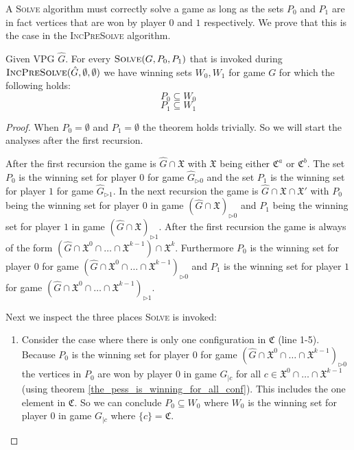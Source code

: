 A \textsc{Solve} algorithm must correctly solve a game as long as the sets $P_0$ and $P_1$ are in fact vertices that are won by player $0$ and $1$ respectively. We prove that this is the case in the \textsc{IncPreSolve} algorithm.
\begin{theorem}
	Given VPG $\hat{G}$. For every $\textsc{Solve}(G,P_0,P_1)$ that is invoked during $\textsc{IncPreSolve}(\hat{G},\emptyset,\emptyset)$ we have winning sets $W_0,W_1$ for game $G$ for which the following holds:
	\[ P_0 \subseteq  W_0 \]
	\[ P_1 \subseteq  W_1 \]
	\begin{proof}
		When $P_0 = \emptyset$ and $P_1 = \emptyset$ the theorem holds trivially. So we will start the analyses after the first recursion. 
		
		After the first recursion the game is $\hat{G} \cap \mathfrak{X}$ with $\mathfrak{X}$ being either $\mathfrak{C}^a$ or $\mathfrak{C}^b$. The set $P_0$ is the winning set for player $0$ for game $\hat{G}_{\triangleright0}$ and the set $P_1$ is the winning set for player $1$ for game $\hat{G}_{\triangleright1}$. In the next recursion the game is $\hat{G} \cap \mathfrak{X} \cap \mathfrak{X}'$ with $P_0$ being the winning set for player $0$ in game $(\hat{G} \cap \mathfrak{X})_{\triangleright0}$ and $P_1$ being the winning set for player $1$ in game $(\hat{G} \cap \mathfrak{X})_{\triangleright1}$. After the first recursion the game is always of the form  $(\hat{G} \cap \mathfrak{X}^0 \cap \dots \cap \mathfrak{X}^{k-1}) \cap \mathfrak{X}^k$. Furthermore $P_0$ is the winning set for player $0$ for game $(\hat{G} \cap \mathfrak{X}^0 \cap \dots \cap \mathfrak{X}^{k-1})_{\triangleright0}$ and $P_1$ is the winning set for player $1$ for game $(\hat{G} \cap \mathfrak{X}^0 \cap \dots \cap \mathfrak{X}^{k-1})_{\triangleright1}$.
		
		Next we inspect the three places \textsc{Solve} is invoked:
		\begin{enumerate}
			\item Consider the case where there is only one configuration in $\mathfrak{C}$ (line 1-5). Because $P_0$ is the winning set for player $0$ for game $(\hat{G} \cap \mathfrak{X}^0 \cap \dots \cap \mathfrak{X}^{k-1})_{\triangleright0}$ the vertices in $P_0$ are won by player $0$ in game $G_{|c}$ for all $c \in \mathfrak{X}^0 \cap \dots \cap \mathfrak{X}^{k-1}$ (using theorem \ref{the_pess_is_winning_for_all_conf}). This includes the one element in $\mathfrak{C}$. So we can conclude $P_0 \subseteq W_0$ where $W_0$ is the winning set for player $0$ in game $G_{|c}$ where $\{c\} = \mathfrak{C}$.
			

\end{enumerate}
\end{proof}
\end{theorem}
